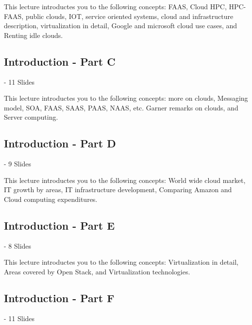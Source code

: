 This lecture introductes you to the following concepts: FAAS, Cloud
HPC, HPC-FAAS, public clouds, IOT, service oriented systems, cloud and
infrastructure description, virtualization in detail, Google and
microsoft cloud use cases, and Renting idle clouds.

\subsection{Introduction - Part C}\label{s:cloud-fundamentals-c}

 - 11 Slides

This lecture introductes you to the following concepts: more on
clouds, Messaging model, SOA, FAAS, SAAS, PAAS, NAAS, etc. Garner
remarks on clouds, and Server computing.

\subsection{Introduction - Part D}\label{s:cloud-fundamentals-d}
 - 9 Slides

This lecture introductes you to the following concepts: World wide
cloud market, IT growth by areas, IT infrastructure development,
Comparing Amazon and Cloud computing expenditures.

\subsection{Introduction - Part E}\label{s:cloud-fundamentals-e}
 - 8 Slides

This lecture introductes you to the following concepts: Virtualization
in detail, Areas covered by Open Stack, and Virtualization technologies.

\subsection{Introduction - Part F}\label{s:cloud-fundamentals-f}
 - 11 Slides

